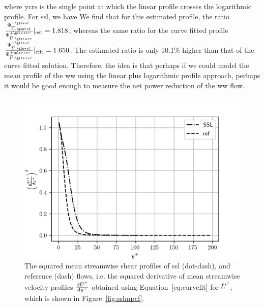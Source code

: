 where \gls*{ycrs} is the single point at which the linear profile crosses the logarithmic profile. For \gls*{ssl}, we have We find that for this estimated profile, the ratio $\frac{\Phi _{\overline{U},\gls*{sl}}\ps}{\Phi _{\overline{U},\gls*{zer}}\pz}\rvert_\text{est}=1.818$, whereas the same ratio for the curve fitted profile $\frac{\Phi _{\overline{U},\gls*{sl}}\ps}{\Phi _{\overline{U},\gls*{zer}}\pz}\rvert_\text{cfit}=1.650$. The estimated ratio is only 10.1\% higher than that of the curve fitted solution. Therefore, the idea is that perhaps if we could model the mean profile of the \gls*{ww} using the linear plus logarithmic profile approach, perhaps it would be good enough to measure the net power reduction of the \gls*{ww} flow.
\begin{figure}[htbp]
	\centering
	\includegraphics[width=0.7\linewidth]{project/fig/sslmeandiff.png}
	\caption[Mean streamwise shear profile squared of SSL and reference flows]{The squared mean streamwise shear profiles of \gls*{ssl} (dot-dash), and reference (dash) flows, i.e. the squared derivative of mean streamwise velocity profiles $\dv{\overline{U}^{+}}{y^{+}} $ obtained using Equation~\eqref{eq:curvefit} for $\overline{U}^{+}$, which is shown in Figure~\ref{fig:sslmpcf}.}
	\label{fig:sslmpdiff}
\end{figure}

